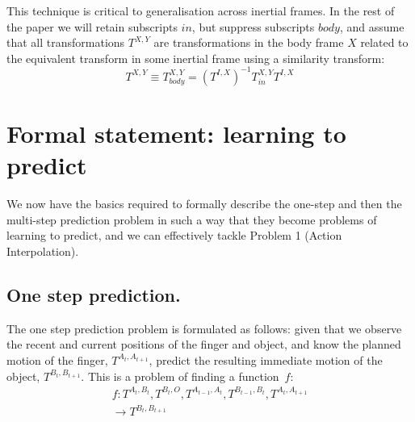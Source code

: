 %
This technique is critical to generalisation across inertial frames. In the rest of the paper we will retain subscripts $in$, but suppress subscripts $body$, and assume that all transformations $T^{X, Y}$ are transformations in the body frame $X$ related to the equivalent transform in some inertial frame using a similarity transform:
\begin{equation}
T^{X, Y} \equiv T_{body}^{X, Y} = ({T^{I, X}})^{-1} T_{in}^{X, Y} {T^{I, X}}
\label{eq:Learning.Similarity}
\end{equation}

\section{Formal statement: learning to predict}
\label{sec:PredictionProblem}

We now have the basics required to formally describe the one-step and then the multi-step prediction
problem in such a way that they become problems of learning to predict, and we can effectively tackle Problem 1 (Action Interpolation).

\subsection{One step prediction.} The one step prediction problem is formulated as follows: given that we observe the recent and current positions of the finger and object, and know the planned motion of the finger, $T^{A_{t},  A_{t+1}}$, predict the resulting immediate motion of the object,
$T^{B_{t}, B_{t+1}}$.  This is a problem of finding a function~$f$:
\begin{multline}
f:T^{A_t, B_t}, T^{B_t, O}, T^{A_{t-1}, A_{t}}, T^{B_{t-1}, B_{t}}, T^{A_{t}, A_{t+1}} \\ \longrightarrow T^{B_{t}, B_{t+1}}
\label{eq:Learning.long}
\end{multline}

